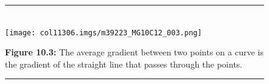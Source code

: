 	\begin{figure}[H] %
    \begin{center}
    \rule[.1in]{\figurerulewidth}{.005in} \\
        \label{m39223*uid3!!!underscore!!!media}\label{m39223*uid3!!!underscore!!!printimage}\texttt{[image: col11306.imgs/m39223\_MG10C12\_003.png]} %
      \vspace{2pt}
    \vspace{\rubberspace}\par \begin{cnxcaption}
	  \small \textbf{Figure 10.3: }The average gradient between two points on a curve is the gradient of the straight line that passes through the points.
	\end{cnxcaption}
    \vspace{.1in}
    \rule[.1in]{\figurerulewidth}{.005in} \\
    \end{center}
 \end{figure}       
      \label{m39223*uid4}
